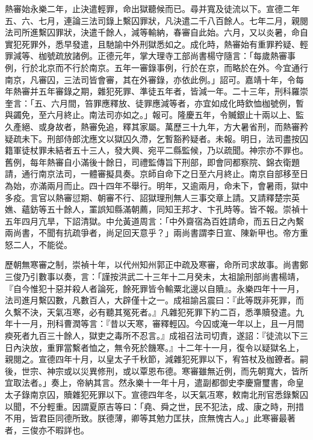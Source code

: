 熱審始永樂二年，止決遣輕罪，命出獄聽候而已。尋并寬及徒流以下。宣德二年五、六、七月，連論三法司錄上繫囚罪狀，凡決遣二千八百餘人。七年二月，親閱法司所進繫囚罪狀，決遣千餘人，減等輸納，春審自此始。六月，又以炎暑，命自實犯死罪外，悉早發遣，且馳諭中外刑獄悉如之。成化時，熱審始有重罪矜疑、輕罪減等、枷號疏放諸例。正德元年，掌大理寺工部尚書楊守隨言：「每歲熱審事例，行於北京而不行於南京。五年一審錄事例，行於在京，而略於在外。今宜通行南京，凡審囚，三法司皆會審，其在外審錄，亦依此例。」詔可。嘉靖十年，令每年熱審并五年審錄之期，雜犯死罪、準徒五年者，皆減一年。二十三年，刑科羅崇奎言：「五、六月間，笞罪應釋放、徒罪應減等者，亦宜如成化時欽恤枷號例，暫與蠲免，至六月終止。南法司亦如之。」報可。隆慶五年，令贓銀止十兩以上、監久產絕、或身故者，熱審免追，釋其家屬。萬歷三十九年，方大暑省刑，而熱審矜疑疏未下。刑部侍郎沈應文以獄囚久滯，乞暫豁矜疑者。未報。明日，法司盡按囚籍軍徒杖罪未結者五十三人，發大興、宛平二縣監候，乃以疏聞。神宗亦不罪也。舊例，每年熱審自小滿後十餘日，司禮監傳旨下刑部，即會同都察院、錦衣衛題請，通行南京法司，一體審擬具奏。京師自命下之日至六月終止。南京自部移至日為始，亦滿兩月而止。四十四年不舉行。明年，又逾兩月，命未下，會暑雨，獄中多疫。言官以熱審愆期、朝審不行、詔獄理刑無人三事交章上請。又請釋楚宗英嫶、蘊鈁等五十餘人，罣誤知縣滿朝薦，同知王邦才、卞孔時等。皆不報。崇禎十五年四月亢旱，下詔清獄。中允黃道周言：「中外齋宿為百姓請命，而五日之內繫兩尚書，不聞有抗疏爭者，尚足回天意乎？」兩尚書謂李日宣、陳新甲也。帝方重怒二人，不能從。

歷朝無寒審之制，崇禎十年，以代州知州郭正中疏及寒審，命所司求故事。尚書鄭三俊乃引數事以奏，言：「謹按洪武二十三年十二月癸未，太祖諭刑部尚書楊靖，『自今惟犯十惡并殺人者論死，餘死罪皆令輸粟北邊以自贖』。永樂四年十一月，法司進月繫囚數，凡數百人，大辟僅十之一。成祖諭呂震曰：『此等既非死罪，而久繫不決，天氣冱寒，必有聽其冤死者。』凡雜犯死罪下約二百，悉準贖發遣。九年十一月，刑科曹潤等言：『昔以天寒，審釋輕囚。今囚或淹一年以上，且一月間瘐死者九百三十餘人，獄吏之毒所不忍言。』成祖召法司切責，遂詔：『徒流以下三日內決放，重罪當繫者恤之，無令死於饑寒。』十二年十一月，復令以疑獄名上，親閱之。宣德四年十月，以皇太子千秋節，減雜犯死罪以下，宥笞杖及枷鐐者。嗣後，世宗、神宗或以災異修刑，或以覃恩布德。寒審雖無近例，而先朝寬大，皆所宜取法者。」奏上，帝納其言。然永樂十一年十月，遣副都御史李慶齎璽書，命皇太子錄南京囚，贖雜犯死罪以下。宣德四年冬，以天氣冱寒，敕南北刑官悉錄繫囚以聞，不分輕重。因謂夏原吉等曰：「堯、舜之世，民不犯法，成、康之時，刑措不用，皆君臣同德所致。朕德薄，卿等其勉力匡扶，庶無愧古人。」此寒審最著者，三俊亦不暇詳也。

